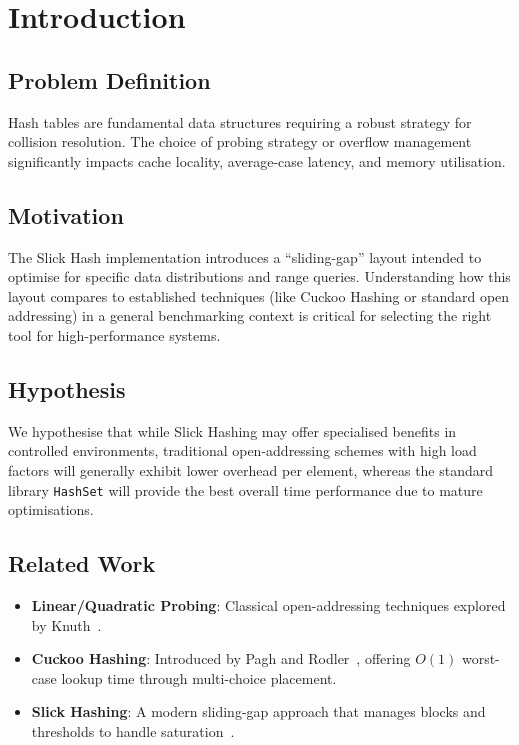 \documentclass[11pt,a4paper]{article}
\begin{document}
\vspace{1em}

\section{Introduction}

\subsection{Problem Definition}

Hash tables are fundamental data structures requiring a robust strategy for collision resolution. The choice of probing strategy or overflow management significantly impacts cache locality, average-case latency, and memory utilisation.

\subsection{Motivation}

The Slick Hash implementation introduces a ``sliding-gap'' layout intended to optimise for specific data distributions and range queries. Understanding how this layout compares to established techniques (like Cuckoo Hashing or standard open addressing) in a general benchmarking context is critical for selecting the right tool for high-performance systems.

\subsection{Hypothesis}

We hypothesise that while Slick Hashing may offer specialised benefits in controlled environments, traditional open-addressing schemes with high load factors will generally exhibit lower overhead per element, whereas the standard library \texttt{HashSet} will provide the best overall time performance due to mature optimisations.

\subsection{Related Work}

\begin{itemize}
  \item \textbf{Linear/Quadratic Probing}: Classical open-addressing techniques explored by Knuth~\cite{knuth1998}.
  \item \textbf{Cuckoo Hashing}: Introduced by Pagh and Rodler~\cite{pagh2001}, offering $O(1)$ worst-case lookup time through multi-choice placement.
  \item \textbf{Slick Hashing}: A modern sliding-gap approach that manages blocks and thresholds to handle saturation~\cite{slick2024,slick2023}.
\end{itemize}
\end{document}
